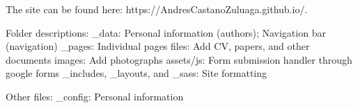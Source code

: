 The site can be found here: https://AndresCastanoZuluaga.github.io/.

Folder descriptions:
_data: Personal information (authors); Navigation bar (navigation)
_pages: Individual pages
files: Add CV, papers, and other documents
images: Add photographs
assets/js: Form submission handler through google forms
_includes, _layouts, and _sass: Site formatting

Other files:
_config: Personal information
